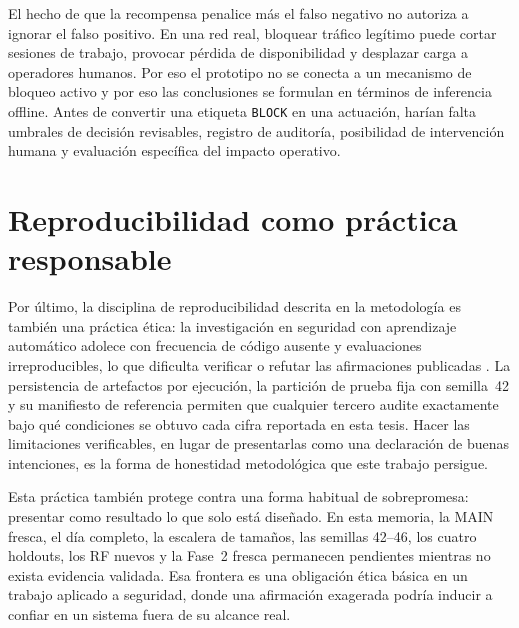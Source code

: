 El hecho de que la recompensa penalice más el falso negativo no autoriza a ignorar el falso positivo. En una red real, bloquear tráfico legítimo puede cortar sesiones de trabajo, provocar pérdida de disponibilidad y desplazar carga a operadores humanos. Por eso el prototipo no se conecta a un mecanismo de bloqueo activo y por eso las conclusiones se formulan en términos de inferencia offline. Antes de convertir una etiqueta \texttt{BLOCK} en una actuación, harían falta umbrales de decisión revisables, registro de auditoría, posibilidad de intervención humana y evaluación específica del impacto operativo.

\section{Reproducibilidad como práctica responsable}
Por último, la disciplina de reproducibilidad descrita en la metodología es también una práctica ética: la investigación en seguridad con aprendizaje automático adolece con frecuencia de código ausente y evaluaciones irreproducibles, lo que dificulta verificar o refutar las afirmaciones publicadas \parencite{Olszewski2023ReproSecurityML,Arp2020DosDontsMLSecurity}. La persistencia de artefactos por ejecución, la partición de prueba fija con semilla~42 y su manifiesto de referencia permiten que cualquier tercero audite exactamente bajo qué condiciones se obtuvo cada cifra reportada en esta tesis. Hacer las limitaciones verificables, en lugar de presentarlas como una declaración de buenas intenciones, es la forma de honestidad metodológica que este trabajo persigue.

Esta práctica también protege contra una forma habitual de sobrepromesa: presentar como resultado lo que solo está diseñado. En esta memoria, la MAIN fresca, el día completo, la escalera de tamaños, las semillas 42--46, los cuatro holdouts, los RF nuevos y la Fase~2 fresca permanecen pendientes mientras no exista evidencia validada. Esa frontera es una obligación ética básica en un trabajo aplicado a seguridad, donde una afirmación exagerada podría inducir a confiar en un sistema fuera de su alcance real.

